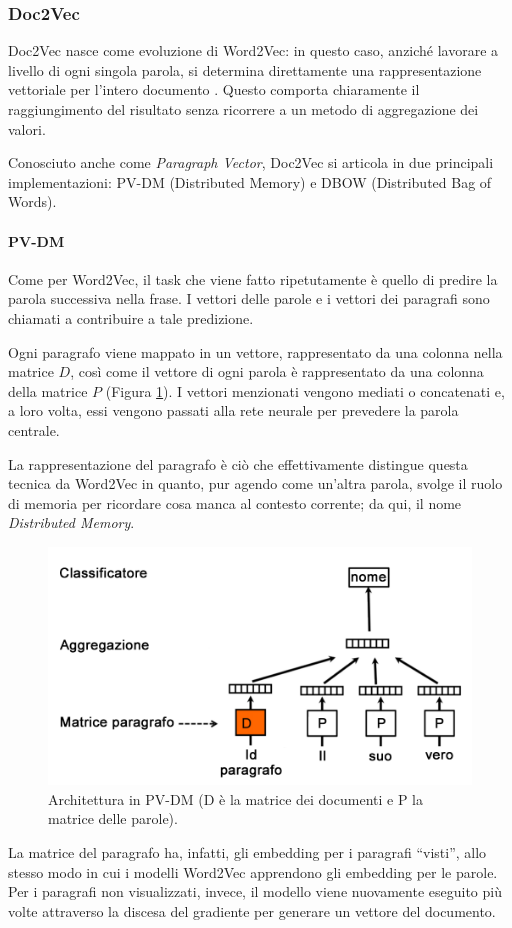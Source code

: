 \documentclass[12pt]{report}
\theoremstyle{definition}
\begin{document}
\subsubsection{Doc2Vec} \label{d2v}
Doc2Vec nasce come evoluzione di Word2Vec: in questo caso, anziché lavorare a livello di ogni singola parola, si determina direttamente una rappresentazione vettoriale per l'intero documento \cite{24}.
Questo comporta chiaramente il raggiungimento del risultato senza ricorrere a un metodo di aggregazione dei valori.

Conosciuto anche come \textit{Paragraph Vector}, Doc2Vec si articola in due principali implementazioni: PV-DM (Distributed Memory) e DBOW (Distributed Bag of Words).

\paragraph{PV-DM} 
Come per Word2Vec, il task che viene fatto ripetutamente è quello di predire la parola successiva nella frase. I vettori delle parole e i vettori dei paragrafi sono chiamati a contribuire a tale predizione.

Ogni paragrafo viene mappato in un vettore, rappresentato da una colonna nella matrice $D$, così come il vettore di ogni parola è rappresentato da una colonna della matrice $P$ (Figura \ref{pvdm}). I vettori menzionati vengono mediati o concatenati e, a loro volta, essi vengono passati alla rete neurale per prevedere la parola centrale.

La rappresentazione del paragrafo è ciò che effettivamente distingue questa tecnica da Word2Vec in quanto, pur agendo come un'altra parola, svolge il ruolo di memoria per ricordare cosa manca al contesto corrente; da qui, il nome \textit{Distributed Memory}.
\begin{figure}
    \centering
    \includegraphics[scale = 0.3]{images/pvdm.png}
    \caption{Architettura in PV-DM (D è la matrice dei documenti e P la matrice delle parole).}
    \label{pvdm}
\end{figure}
La matrice del paragrafo ha, infatti, gli embedding per i paragrafi ``visti'', allo stesso modo in cui i modelli Word2Vec apprendono gli embedding per le parole. Per i paragrafi non visualizzati, invece, il modello viene nuovamente eseguito più volte attraverso la discesa del gradiente per generare un vettore del documento. 
\end{document}
